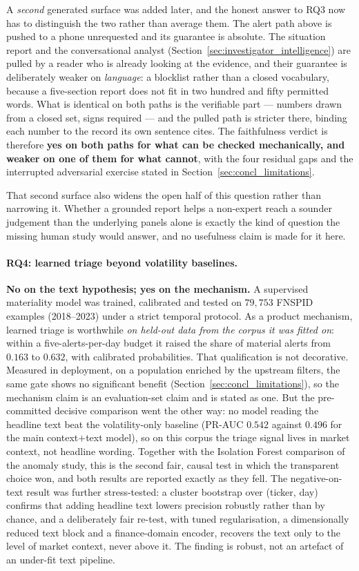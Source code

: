 A \emph{second} generated surface was added later, and the honest answer to RQ3 now has to
distinguish the two rather than average them. The alert path above is pushed to a phone unrequested
and its guarantee is absolute. The situation report and the conversational analyst
(Section~\ref{sec:investigator_intelligence}) are pulled by a reader who is already looking at the
evidence, and their guarantee is deliberately weaker on \emph{language}: a blocklist rather than a
closed vocabulary, because a five-section report does not fit in two hundred and fifty permitted
words. What is identical on both paths is the verifiable part --- numbers drawn from a closed set,
signs required --- and the pulled path is stricter there, binding each number to the record its own
sentence cites. The faithfulness verdict is therefore \textbf{yes on both paths for what can be
checked mechanically, and weaker on one of them for what cannot}, with the four residual gaps and
the interrupted adversarial exercise stated in Section~\ref{sec:concl_limitations}.

That second surface also widens the open half of this question rather than narrowing it. Whether a
grounded report helps a non-expert reach a sounder judgement than the underlying panels alone is
exactly the kind of question the missing human study would answer, and no usefulness claim is made
for it here.

\paragraph{RQ4: learned triage beyond volatility baselines.}
\textbf{No on the text hypothesis; yes on the mechanism.} A supervised materiality model was trained,
calibrated and tested on $79{,}753$ FNSPID examples (2018--2023) under a strict temporal protocol. As a
product mechanism, learned triage is worthwhile \emph{on held-out data from the corpus it was fitted
on}: within a five-alerts-per-day budget it raised the share of material alerts from $0.163$ to
$0.632$, with calibrated probabilities. That qualification is not decorative. Measured in deployment,
on a population enriched by the upstream filters, the same gate shows no significant benefit
(Section~\ref{sec:concl_limitations}), so the mechanism claim is an evaluation-set claim and is stated
as one. But the
pre-committed decisive comparison went the other way: no model reading the headline text beat the
volatility-only baseline (PR-AUC $0.542$ against $0.496$ for the main context$+$text model), so on this
corpus the triage signal lives in market context, not headline wording. Together with the Isolation
Forest comparison of the anomaly study, this is the second fair, causal test in which the transparent
choice won, and both results are reported exactly as they fell. The negative-on-text result was
further stress-tested: a cluster bootstrap over (ticker, day) confirms that adding headline text
lowers precision robustly rather than by chance, and a deliberately fair re-test, with tuned
regularisation, a dimensionally reduced text block and a finance-domain encoder, recovers the text
only to the level of market context, never above it. The finding is robust, not an artefact of an
under-fit text pipeline.

